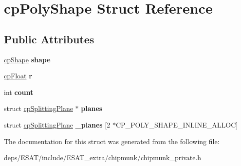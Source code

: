 \hypertarget{structcp_poly_shape}{}\section{cp\+Poly\+Shape Struct Reference}
\label{structcp_poly_shape}
\subsection*{Public Attributes}
\begin{DoxyCompactItemize}
\item 
\mbox{\label{structcp_poly_shape_ac012e90aea902a2148bd5b43028d2e33}} 
\mbox{\hyperlink{structcp_shape}{cp\+Shape}} {\bfseries shape}
\item 
\mbox{\label{structcp_poly_shape_adeca191bc792ac86ad2e0e4b454ddbd3}} 
\mbox{\hyperlink{group__basic_types_gac1ed65573e035bf892505768c852d8d3}{cp\+Float}} {\bfseries r}
\item 
\mbox{\label{structcp_poly_shape_abfb92a30816b97bfc1bb34fb7246c26d}} 
int {\bfseries count}
\item 
\mbox{\label{structcp_poly_shape_aac3e3f0ea0474c6caf6c91a31374a928}} 
struct \mbox{\hyperlink{structcp_splitting_plane}{cp\+Splitting\+Plane}} $\ast$ {\bfseries planes}
\item 
\mbox{\label{structcp_poly_shape_a12a9e302a3f107cbe9e6087abe8abc2b}} 
struct \mbox{\hyperlink{structcp_splitting_plane}{cp\+Splitting\+Plane}} {\bfseries \+\_\+planes} \mbox{[}2 $\ast$C\+P\+\_\+\+P\+O\+L\+Y\+\_\+\+S\+H\+A\+P\+E\+\_\+\+I\+N\+L\+I\+N\+E\+\_\+\+A\+L\+L\+OC\mbox{]}
\end{DoxyCompactItemize}


The documentation for this struct was generated from the following file\+:\begin{DoxyCompactItemize}
\item 
deps/\+E\+S\+A\+T/include/\+E\+S\+A\+T\+\_\+extra/chipmunk/chipmunk\+\_\+private.\+h\end{DoxyCompactItemize}
